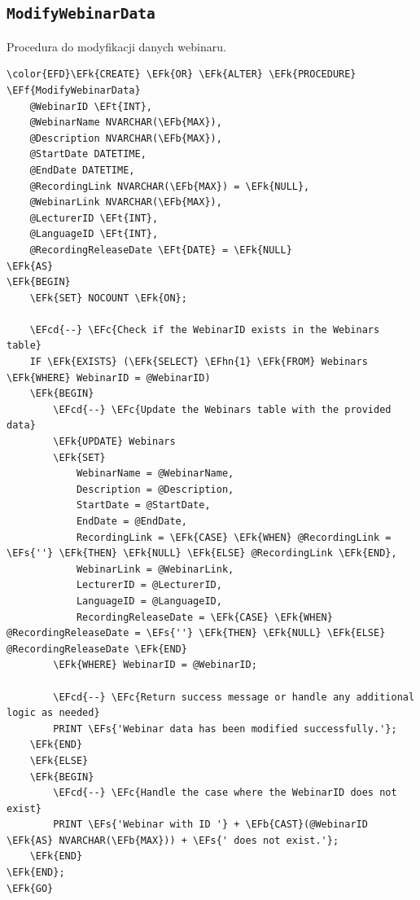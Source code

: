 \documentclass[11pt]{article}
\newcommand{\EFc}[1]{\textcolor{EFc}{\textit{#1}}} %
\newcommand{\EFcd}[1]{\textcolor{EFcd}{\textit{#1}}} %
\newcommand{\EFs}[1]{\textcolor{EFs}{#1}} %
\newcommand{\EFk}[1]{\textcolor{EFk}{\textbf{#1}}} %
\newcommand{\EFb}[1]{\textcolor{EFb}{\textbf{#1}}} %
\newcommand{\EFf}[1]{\textcolor{EFf}{#1}} %
\newcommand{\EFt}[1]{\textcolor{EFt}{\textbf{#1}}} %
\newcommand{\EFhn}[1]{\textcolor{EFhn}{#1}} %
\begin{document}
\subsection{\texttt{ModifyWebinarData}}
\label{sec:orgedc1f3c}
Procedura do modyfikacji danych webinaru.
\begin{Code}
\begin{Verbatim}
\color{EFD}\EFk{CREATE} \EFk{OR} \EFk{ALTER} \EFk{PROCEDURE} \EFf{ModifyWebinarData}
    @WebinarID \EFt{INT},
    @WebinarName NVARCHAR(\EFb{MAX}),
    @Description NVARCHAR(\EFb{MAX}),
    @StartDate DATETIME,
    @EndDate DATETIME,
    @RecordingLink NVARCHAR(\EFb{MAX}) = \EFk{NULL},
    @WebinarLink NVARCHAR(\EFb{MAX}),
    @LecturerID \EFt{INT},
    @LanguageID \EFt{INT},
    @RecordingReleaseDate \EFt{DATE} = \EFk{NULL}
\EFk{AS}
\EFk{BEGIN}
    \EFk{SET} NOCOUNT \EFk{ON};

    \EFcd{--} \EFc{Check if the WebinarID exists in the Webinars table}
    IF \EFk{EXISTS} (\EFk{SELECT} \EFhn{1} \EFk{FROM} Webinars \EFk{WHERE} WebinarID = @WebinarID)
    \EFk{BEGIN}
        \EFcd{--} \EFc{Update the Webinars table with the provided data}
        \EFk{UPDATE} Webinars
        \EFk{SET} 
            WebinarName = @WebinarName,
            Description = @Description,
            StartDate = @StartDate,
            EndDate = @EndDate,
            RecordingLink = \EFk{CASE} \EFk{WHEN} @RecordingLink = \EFs{''} \EFk{THEN} \EFk{NULL} \EFk{ELSE} @RecordingLink \EFk{END},
            WebinarLink = @WebinarLink,
            LecturerID = @LecturerID,
            LanguageID = @LanguageID,
            RecordingReleaseDate = \EFk{CASE} \EFk{WHEN} @RecordingReleaseDate = \EFs{''} \EFk{THEN} \EFk{NULL} \EFk{ELSE} @RecordingReleaseDate \EFk{END}
        \EFk{WHERE} WebinarID = @WebinarID;

        \EFcd{--} \EFc{Return success message or handle any additional logic as needed}
        PRINT \EFs{'Webinar data has been modified successfully.'};
    \EFk{END}
    \EFk{ELSE}
    \EFk{BEGIN}
        \EFcd{--} \EFc{Handle the case where the WebinarID does not exist}
        PRINT \EFs{'Webinar with ID '} + \EFb{CAST}(@WebinarID \EFk{AS} NVARCHAR(\EFb{MAX})) + \EFs{' does not exist.'};
    \EFk{END}
\EFk{END};
\EFk{GO}
\end{Verbatim}
\end{Code}
\end{document}
